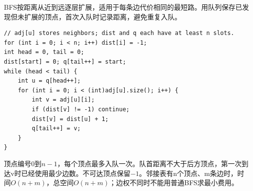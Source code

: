 \documentclass[UTF8,11pt,a4paper,fontset=none]{ctexart}
\begin{document}
BFS按距离从近到远逐层扩展，适用于每条边代价相同的最短路。用队列保存已发现但未扩展的顶点，首次入队时记录距离，避免重复入队。
\par\noindent\begin{minipage}{\linewidth}
\begin{lstlisting}
// adj[u] stores neighbors; dist and q each have at least n slots.
for (int i = 0; i < n; i++) dist[i] = -1;
int head = 0, tail = 0;
dist[start] = 0; q[tail++] = start;
while (head < tail) {
    int u = q[head++];
    for (int i = 0; i < (int)adj[u].size(); i++) {
        int v = adj[u][i];
        if (dist[v] != -1) continue;
        dist[v] = dist[u] + 1;
        q[tail++] = v;
    }
}
\end{lstlisting}
\end{minipage}\par
顶点编号0到$n-1$，每个顶点最多入队一次。队首距离不大于后方顶点，第一次到达v时已经使用最少边数。不可达顶点保留$-1$。邻接表有n个顶点、m条边时，时间$O(n+m)$，总空间$O(n+m)$；边权不同时不能用普通BFS求最小费用。
\end{document}
